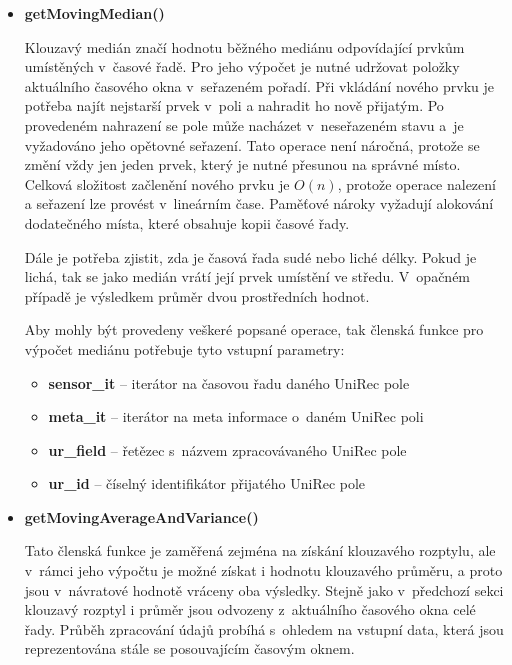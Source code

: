 \begin{itemize}
 \item \textbf{getMovingMedian()}%
 
 
 Klouzavý medián značí hodnotu běžného mediánu odpovídající prvkům umístěných v~časové řadě. 
 Pro jeho výpočet je nutné udržovat položky aktuálního časového okna v~seřazeném pořadí.
 Při vkládání nového prvku je potřeba najít nejstarší prvek v~poli a nahradit ho nově přijatým. 
 Po provedeném nahrazení se pole může nacházet v~neseřazeném stavu a~je 
 vyžadováno jeho opětovné seřazení.
  Tato operace není náročná, protože se změní vždy jen jeden prvek, který je nutné
 přesunou na správné místo. Celková složitost začlenění nového prvku je $O(n)$, protože operace 
 nalezení a seřazení lze provést v~lineárním čase. Paměťové nároky vyžadují alokování dodatečného
 místa, které obsahuje kopii časové řady.
 
 Dále je potřeba zjistit, zda je časová řada sudé nebo liché délky. Pokud je lichá, tak se jako 
 medián vrátí její prvek umístění ve středu. V~opačném případě je výsledkem průměr dvou prostředních
 hodnot.
 
 Aby mohly být provedeny veškeré popsané operace, tak členská funkce pro výpočet mediánu
 potřebuje tyto vstupní parametry:
 \begin{itemize}
   \item \textbf{sensor\_it} -- iterátor na časovou řadu daného UniRec pole
   \item \textbf{meta\_it} -- iterátor na meta informace o~daném UniRec poli
   \item \textbf{ur\_field} -- řetězec s~názvem zpracovávaného UniRec pole
   \item \textbf{ur\_id} -- číselný identifikátor přijatého UniRec pole
 \end{itemize}
 
 \item \textbf{getMovingAverageAndVariance()}%
 
 Tato členská funkce je zaměřená zejména na získání klouzavého rozptylu, ale v~rámci jeho výpočtu je možné
 získat i hodnotu klouzavého průměru, a proto jsou v~návratové hodnotě vráceny oba výsledky.
 Stejně jako v~předchozí sekci klouzavý rozptyl i průměr jsou odvozeny z~aktuálního časového
 okna celé řady.
 Průběh
 zpracování údajů probíhá s~ohledem na vstupní data, která 
 jsou reprezentována stále se posouvajícím časovým oknem. 
 

\end{itemize}
